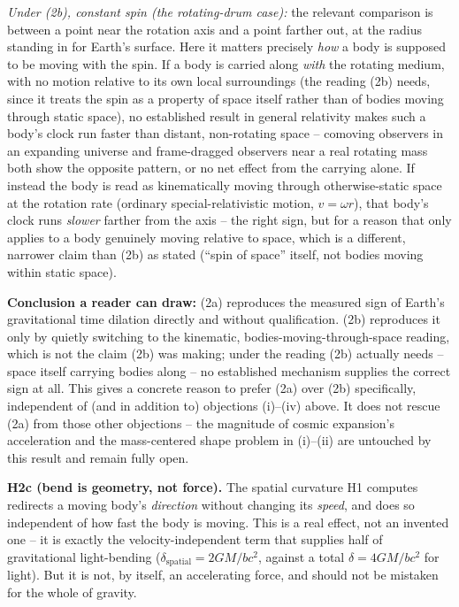 \documentclass[12pt, a4paper]{article}
\begin{document}
\emph{Under (2b), constant spin (the rotating-drum case):} the
relevant comparison is between a point near the rotation axis and a
point farther out, at the radius standing in for Earth's surface.
Here it matters precisely \emph{how} a body is supposed to be moving
with the spin. If a body is carried along \emph{with} the rotating
medium, with no motion relative to its own local surroundings (the
reading (2b) needs, since it treats the spin as a property of space
itself rather than of bodies moving through static space), no
established result in general relativity makes such a body's clock
run faster than distant, non-rotating space -- comoving observers in
an expanding universe and frame-dragged observers near a real
rotating mass both show the opposite pattern, or no net effect from
the carrying alone. If instead the body is read as kinematically
moving through otherwise-static space at the rotation rate (ordinary
special-relativistic motion, $v=\omega r$), that body's clock runs
\emph{slower} farther from the axis -- the right sign, but for a
reason that only applies to a body genuinely moving relative to
space, which is a different, narrower claim than (2b) as stated
(``spin of space'' itself, not bodies moving within static space).

\textbf{Conclusion a reader can draw:} (2a) reproduces the measured
sign of Earth's gravitational time dilation directly and without
qualification. (2b) reproduces it only by quietly switching to the
kinematic, bodies-moving-through-space reading, which is not the
claim (2b) was making; under the reading (2b) actually needs --
space itself carrying bodies along -- no established mechanism
supplies the correct sign at all. This gives a concrete reason to
prefer (2a) over (2b) specifically, independent of (and in addition
to) objections (i)--(iv) above. It does not rescue (2a) from those
other objections -- the magnitude of cosmic expansion's acceleration
and the mass-centered shape problem in (i)--(ii) are untouched by
this result and remain fully open.

\textbf{H2c (bend is geometry, not force).} The spatial curvature H1
computes redirects a moving body's \emph{direction} without changing
its \emph{speed}, and does so independent of how fast the body is
moving. This is a real effect, not an invented one -- it is exactly
the velocity-independent term that supplies half of gravitational
light-bending ($\delta_{\text{spatial}}=2GM/bc^2$, against a total
$\delta=4GM/bc^2$ for light). But it is not, by itself, an
accelerating force, and should not be mistaken for the whole of
gravity.
\end{document}
